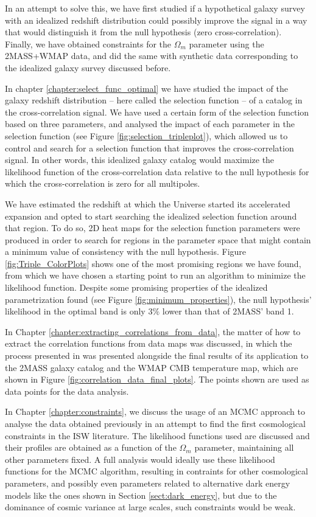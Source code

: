\documentclass[openany,a4paper,12pt,oneside]{book}
\begin{document}
\begin{spacing}{1.5}
In an attempt to solve this, we have first studied if a hypothetical galaxy survey with an idealized redshift distribution could possibly improve the signal in a way that would distinguish it from the null hypothesis (zero cross-correlation). Finally, we have obtained constraints for the $\Omega_m$ parameter using the 2MASS+WMAP data, and did the same with synthetic data corresponding to the idealized galaxy survey discussed before.

In chapter \ref{chapter:select_func_optimal} we have studied the impact of the galaxy redshift distribution -- here called the selection function -- of a catalog in the cross-correlation signal. We have used a certain form of the selection function based on three parameters, and analysed the impact of each parameter in the selection function (see Figure \ref{fig:selection_tripleplot}), which allowed us to control and search for a selection function that improves the cross-correlation signal. In other words, this idealized galaxy catalog would maximize the likelihood function of the cross-correlation data relative to the null hypothesis for which the cross-correlation is zero for all multipoles. 

We have estimated the redshift at which the Universe started its accelerated expansion and opted to start searching the idealized selection function around that region. To do so, 2D heat maps for the selection function parameters were produced in order to search for regions in the parameter space that might contain a minimum value of consistency with the null hypothesis. Figure \ref{fig:Triple_ColorPlots} shows one of the most promising regions we have found, from which we have chosen a starting point to run an algorithm to minimize the likelihood function. Despite some promising properties of the idealized parametrization found (see Figure \ref{fig:minimum_properties}), the null hypothesis' likelihood in the optimal band is only $3\%$ lower than that of 2MASS' band 1.

In Chapter \ref{chapter:extracting_correlations_from_data}, the matter of how to extract the correlation functions from data maps was discussed, in which the process presented in \cite{Moura-Santos_2016} was presented alongside the final results of its application to the 2MASS galaxy catalog and the WMAP CMB temperature map, which are shown in Figure \ref{fig:correlation_data_final_plots}. The points shown are used as data points for the data analysis. 

In Chapter \ref{chapter:constraints}, we discuss the usage of an MCMC approach to analyse the data obtained previously in an attempt to find the first cosmological constraints in the ISW literature. The likelihood functions used are discussed and their profiles are obtained as a function of the $\Omega_m$ parameter, maintaining all other parameters fixed. A full analysis would ideally use these likelihood functions for the MCMC algorithm, resulting in contraints for other cosmological parameters, and possibly even parameters related to alternative dark energy models like the ones shown in Section \ref{sect:dark_energy}, but due to the dominance of cosmic variance at large scales, such constraints would be weak.


\end{spacing}
\end{document}
